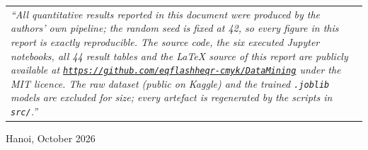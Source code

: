 \begin{titlepage}
\vspace{0.45cm}
\begin{center}
\begin{tabular}{p{11.5cm}}
\textit{``All quantitative results reported in this document were produced by
the authors' own pipeline; the random seed is fixed at 42, so every figure
in this report is exactly reproducible. The source code, the six executed
Jupyter notebooks, all 44 result tables and the LaTeX source of this report
are publicly available at
\href{https://github.com/eqflashheqr-cmyk/DataMining}{\texttt{https://github.com/eqflashheqr-cmyk/DataMining}}
under the MIT licence. The raw dataset (public on Kaggle) and the trained
\texttt{.joblib} models are excluded for size; every artefact is regenerated
by the scripts in \texttt{src/}.''}
\end{tabular}
\end{center}

\vfill

\begin{center}
{\footnotesize Hanoi, October 2026}
\end{center}

\end{titlepage}

\setcounter{page}{2}

\thispagestyle{empty}

\tableofcontents
